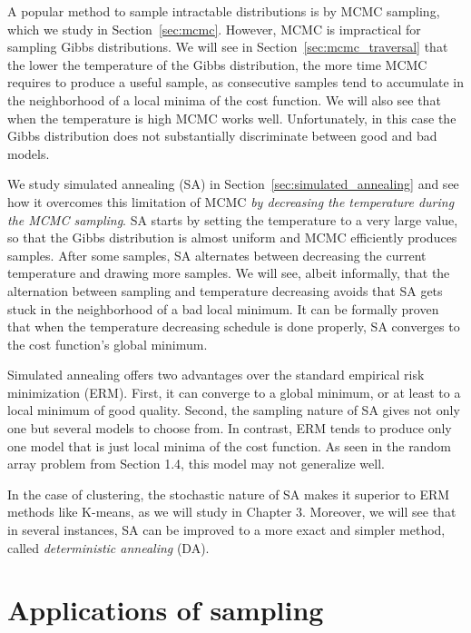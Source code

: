 A popular method to sample intractable distributions is by MCMC
sampling, which we study in Section~\ref{sec:mcmc}. However, MCMC is impractical
for sampling Gibbs distributions. We will see in Section~\ref{sec:mcmc_traversal} that the lower
the temperature of the Gibbs distribution, the more time MCMC requires
to produce a useful sample, as consecutive samples tend to accumulate in
the neighborhood of a local minima of the cost function. We will also see
that when the temperature is high MCMC works well. Unfortunately, in
this case the Gibbs distribution does not substantially discriminate between
good and bad models.

We study simulated annealing (SA) in Section~\ref{sec:simulated_annealing} and see how it overcomes
this limitation of MCMC \emph{by decreasing the temperature during the
MCMC sampling}. SA starts by setting the temperature to a very large
value, so that the Gibbs distribution is almost uniform and MCMC efficiently produces samples. After some samples, SA alternates between decreasing
the current temperature and drawing more samples. We will see,
albeit informally, that the alternation between sampling and temperature
decreasing avoids that SA gets stuck in the neighborhood of a bad local
minimum. It can be formally proven that when the temperature decreasing
schedule is done properly, SA converges to the cost function's global
minimum.

Simulated annealing offers two advantages over the standard empirical
risk minimization (ERM). First, it can converge to a global minimum, or
at least to a local minimum of good quality. Second, the sampling nature
of SA gives not only one but several models to choose from. In contrast,
ERM tends to produce only one model that is just local minima of the
cost function. As seen in the random array problem from Section 1.4, this
model may not generalize well.

In the case of clustering, the stochastic nature of SA makes it superior
to ERM methods like K-means, as we will study in Chapter 3. Moreover,
we will see that in several instances, SA can be improved to a more exact
and simpler method, called \emph{deterministic annealing} (DA).

\section{Applications of sampling}
\label{sec:sampling}

